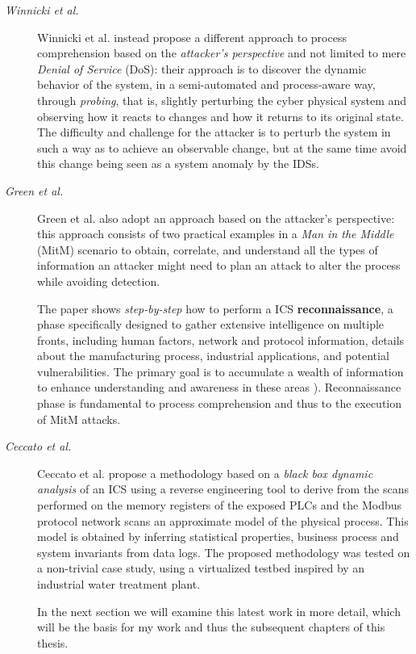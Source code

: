 \begin{description}
	\item[\textit{Winnicki et al.}] Winnicki et al. \cite{winnicki_et_al} instead propose a different approach to process comprehension based on the \textit{attacker's perspective} and not limited to mere \textit{Denial of Service} (DoS): their approach is to discover the dynamic behavior of the system, in a semi-automated and process-aware way, through \textit{probing}, that is, slightly perturbing the cyber physical system and observing how it reacts to changes and how it returns to its original state. The difficulty and challenge for the attacker is to perturb the system in such a way as to achieve an observable change, but at the same time avoid this change being seen as a system anomaly by the IDSs.
	
	\item[\textit{Green et al.}] Green et al. \cite{green_et_al} also adopt an approach based on the attacker's perspective: this approach consists of two practical examples in a \textit{Man in the Middle} (MitM) scenario to obtain, correlate, and understand all the types of information an attacker might need to plan an attack to alter the process while avoiding detection.
	
	The paper shows \textit{step-by-step} how to perform a ICS \textbf{reconnaissance}, a phase specifically designed to gather extensive intelligence on multiple fronts, including human factors, network and protocol information, details about the manufacturing process, industrial applications, and potential vulnerabilities. The primary goal is to accumulate a wealth of information to enhance understanding and awareness in these areas \cite{ot_reconnaissance}).\newline 
	Reconnaissance phase is fundamental to process comprehension and thus to the execution of MitM attacks.
	
	\item[\textit{Ceccato et al.}] Ceccato et al. \cite{ceccato} propose a methodology based on a \textit{black box dynamic analysis} of an ICS using a reverse engineering tool to derive from the scans performed on the memory registers of the exposed PLCs and the Modbus protocol network scans an approximate model of the physical process. This model is obtained by inferring statistical properties, business process and system invariants from data logs.\newline
	The proposed methodology was tested on a non-trivial case study, using a virtualized testbed inspired by an industrial water treatment plant.
	
	In the next section we will examine this latest work in more detail, which will be the basis for my work and thus the subsequent chapters of this thesis.

\end{description}

